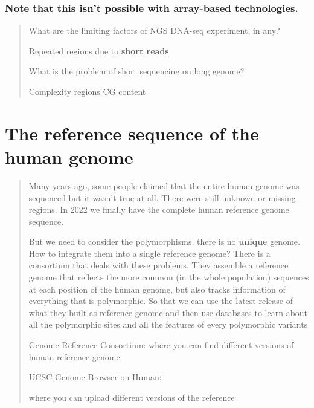 \hypertarget{note-that-this-isnt-possible-with-array-based-technologies.}{%
\subsubsection{Note that this isn't possible with array-based
technologies.}\label{note-that-this-isnt-possible-with-array-based-technologies.}}

\begin{quote}
What are the limiting factors of NGS DNA-seq experiment, in any?

Repeated regions due to \textbf{short reads}

What is the problem of short sequencing on long genome?

Complexity regions CG content
\end{quote}

\hypertarget{the-reference-sequence-of-the-human-genome}{%
\section{The reference sequence of the human
genome}\label{the-reference-sequence-of-the-human-genome}}

\begin{quote}
Many years ago, some people claimed that the entire human genome was
sequenced but it wasn't true at all. There were still unknown or missing
regions. In 2022 we finally have the complete human reference genome
sequence.

But we need to consider the polymorphisms, there is no \textbf{unique}
genome. How to integrate them into a single reference genome? There is a
consortium that deals with these problems. They assemble a reference
genome that reflects the more common (in the whole population) sequences
at each position of the human genome, but also tracks information of
everything that is polymorphic. So that we can use the latest release of
what they built as reference genome and then use databases to learn
about all the polymorphic sites and all the features of every
polymorphic variants

Genome Reference Consortium:
where you can find different versions of human reference genome

UCSC Genome Browser on Human:

where you can upload different versions of the reference
\end{quote}

